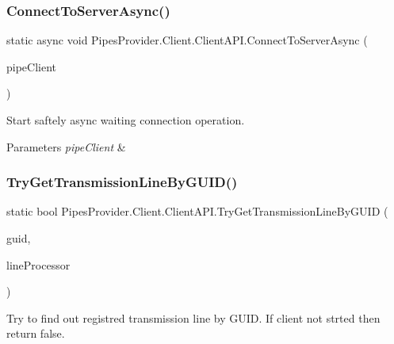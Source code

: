 \subsubsection{\texorpdfstring{Connect\+To\+Server\+Async()}{ConnectToServerAsync()}}
{\footnotesize\ttfamily static async void Pipes\+Provider.\+Client.\+Client\+A\+P\+I.\+Connect\+To\+Server\+Async (\begin{DoxyParamCaption}\item[{Named\+Pipe\+Client\+Stream}]{pipe\+Client }\end{DoxyParamCaption})\hspace{0.3cm}{\ttfamily [static]}}



Start saftely async waiting connection operation. 


\begin{DoxyParams}{Parameters}
{\em pipe\+Client} & \\
\hline
\end{DoxyParams}
\mbox{\label{class_pipes_provider_1_1_client_1_1_client_a_p_i_a745ac6dce4a89785c4b9306af84871e7}} 
\subsubsection{\texorpdfstring{Try\+Get\+Transmission\+Line\+By\+G\+U\+I\+D()}{TryGetTransmissionLineByGUID()}}
{\footnotesize\ttfamily static bool Pipes\+Provider.\+Client.\+Client\+A\+P\+I.\+Try\+Get\+Transmission\+Line\+By\+G\+U\+ID (\begin{DoxyParamCaption}\item[{string}]{guid,  }\item[{out \mbox{\hyperlink{class_pipes_provider_1_1_client_1_1_transmission_line}{Transmission\+Line}}}]{line\+Processor }\end{DoxyParamCaption})\hspace{0.3cm}{\ttfamily [static]}}



Try to find out registred transmission line by G\+U\+ID. If client not strted then return false. 


